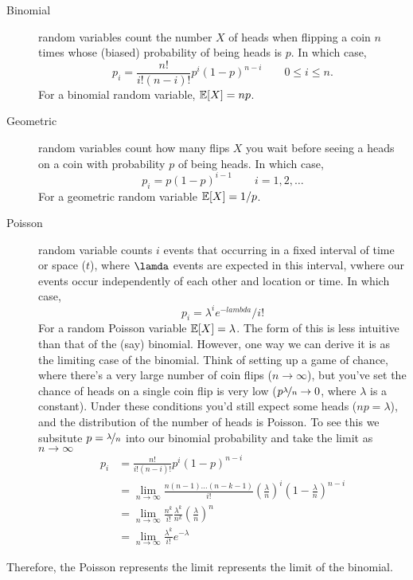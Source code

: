 \begin{description}
\item[Binomial]  random variables count the number $X$ of heads when
  flipping a coin $n$ times whose (biased) probability of being heads is $p$. In which case, 
\begin{equation}
  p_i = \frac{n!}{i!(n-i)!} p^i (1-p)^{n-i} \qquad 0\le i \le n.
\end{equation}
For a binomial random variable, $\mathbb{E}[X]=np$. 

\item[Geometric] random variables count how many flips $X$ you wait before seeing a heads on a coin with probability $p$ of being heads. In which case, 
\[
p_i =p (1-p)^{i-1} \qquad i=1,2,\dots
\]
For a geometric random variable $\mathbb{E}[X]=1/p$.

\item[Poisson] random variable counts $i$ events that occurring in a
  fixed interval of time or space ($t$), where $\lamda$ events are
  expected in this interval, vwhere our events occur independently of
  each other and location or time. In which case,
 \begin{equation}
p_i = \lambda^i e^{-lambda}/i!
\end{equation}
For a random Poisson variable $\mathbb{E}[X]=\lambda$. The form of this is less intuitive than that of the (say)
 binomial. However, one way we can derive it is as the limiting case of the
 binomial. Think of setting up a game of chance, where there's a very large number of coin
 flips ($n \rightarrow \infty$), but you've set the chance of heads on a single
 coin flip is very low ($p  \nicefrac{\lambda}{n} \rightarrow 0$,
 where $\lambda$ is a constant).  Under these conditions you'd still
 expect some heads ($np =\lambda$), and the distribution of the number
 of heads is Poisson. To see this we subsitute
 $p=\nicefrac{\lambda}{n}$ into our binomial probability and take
 the limit as $n \to \infty$ 
 \begin{align}
   p_i &= \frac{n!}{i!(n-i)!} p^i (1-p)^{n-i} \nonumber\\
         &= \lim_{n\to\infty} \frac{n(n-1)\ldots
         (n-k-1)}{i!} \left(  \frac{\lambda}{n}\right)^i \left(1-
         \frac{\lambda}{n}\right)^{n-i} \nonumber\\
   & = \lim_{n\to\infty} \frac{n^k}{i!} \frac{\lambda^k}{n^k} \left(
     \frac{\lambda}{n}\right)^n \nonumber\\
 &=  \lim_{n\to\infty} \frac{\lambda^k}{i!} e^{-\lambda}
 \end{align}
 \end{description}
Therefore, the Poisson represents the limit represents the limit of
the binomial. 

